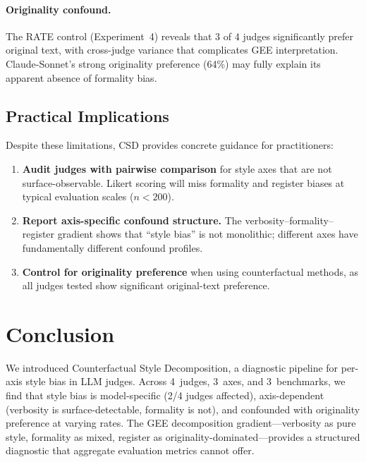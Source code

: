 \documentclass[11pt,a4paper]{article}
\begin{document}
\paragraph{Originality confound.} The RATE control (Experiment~4) reveals that 3 of 4 judges significantly prefer original text, with cross-judge variance that complicates GEE interpretation. Claude-Sonnet's strong originality preference (64\%) may fully explain its apparent absence of formality bias.

\subsection{Practical Implications}

Despite these limitations, CSD provides concrete guidance for practitioners:

\begin{enumerate}
    \item \textbf{Audit judges with pairwise comparison} for style axes that are not surface-observable. Likert scoring will miss formality and register biases at typical evaluation scales ($n < 200$).
    \item \textbf{Report axis-specific confound structure.} The verbosity--formality--register gradient shows that ``style bias'' is not monolithic; different axes have fundamentally different confound profiles.
    \item \textbf{Control for originality preference} when using counterfactual methods, as all judges tested show significant original-text preference.
\end{enumerate}

\section{Conclusion}

We introduced Counterfactual Style Decomposition, a diagnostic pipeline for per-axis style bias in LLM judges. Across 4~judges, 3~axes, and 3~benchmarks, we find that style bias is model-specific (2/4 judges affected), axis-dependent (verbosity is surface-detectable, formality is not), and confounded with originality preference at varying rates. The GEE decomposition gradient---verbosity as pure style, formality as mixed, register as originality-dominated---provides a structured diagnostic that aggregate evaluation metrics cannot offer.
\end{document}
